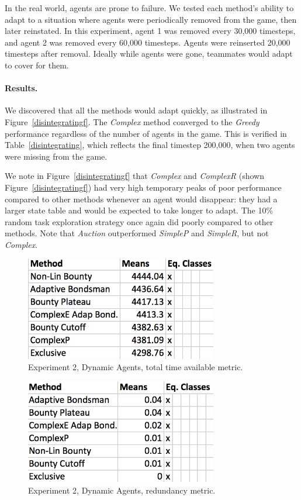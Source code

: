 \documentclass[letterpaper]{aamas2015}
\newcommand\paragrapha[1]{\paragraph*{{#1}.}}
\begin{document}
In the real world, agents are prone to failure. We tested each method's ability to adapt to a situation where agents were periodically removed from the game, then later reinstated.  In this experiment, agent 1 was removed every 30,000 timesteps, and agent 2 was removed every 60,000 timesteps.  Agents were reinserted 20,000 timesteps after removal.  Ideally while agents were gone,  teammates would adapt to cover for them.


\paragrapha{Results}

We discovered that all the methods would adapt quickly, as illustrated in Figure~\ref{disintegratingf}. The \textit{Complex} method converged to the {\it Greedy}  performance regardless of the number of agents in the game.  This is verified in Table~\ref{disintegrating}, which reflects the final timestep 200,000, when two agents were missing from the game.

We note in Figure~\ref{disintegratingf} that \textit{Complex} and \textit{ComplexR}  (shown Figure~\ref{disintegratingf}) had very high temporary peaks of poor performance compared to other methods whenever an agent would disappear: they had a larger state table and would be expected to take longer to adapt.   The 10\% random task exploration strategy once again did poorly compared to other methods. Note that \textit{Auction} outperformed  \textit{SimpleP} and \textit{SimpleR}, but not \textit{Complex}.



\begin{figure}[t]
\begin{center}\includegraphics[width=3.3in]{dynAgentT.png}\end{center}
\vspace{-0.5em}\caption{Experiment 2, Dynamic Agents, total time available metric.}
\label{dynAgentT}
\end{figure}

\begin{figure}[t]
\begin{center}\includegraphics[width=3.3in]{dynAgentR.png}\end{center}
\vspace{-0.5em}\caption{Experiment 2, Dynamic Agents, redundancy metric.}
\label{dynAgentR}
\end{figure}
\end{document}
